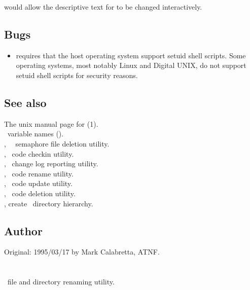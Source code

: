 \noindent
would allow the descriptive text for  to be changed interactively.

\subsection*{Bugs}

\begin{itemize}
\item
    requires that the host operating system support setuid shell
   scripts.  Some operating systems, most notably Linux and Digital
   UNIX, do not support setuid shell scripts for security reasons.
\end{itemize}

\subsection*{See also}

The unix manual page for (1).\\
\aipspp\ variable names ().\\
, \aipspp\ \rcs\ semaphore file deletion utility.\\
, \aipspp\ code checkin utility.\\
, \aipspp\ change log reporting utility.\\
, \aipspp\ code rename utility.\\
, \aipspp\ code update utility.\\
, \aipspp\ code deletion utility.\\
, create \aipspp\ directory hierarchy.

\subsection*{Author}

Original: 1995/03/17 by Mark Calabretta, ATNF.


\newpage
\section{}
\label{amv}

\aipspp\ file and directory renaming utility.

